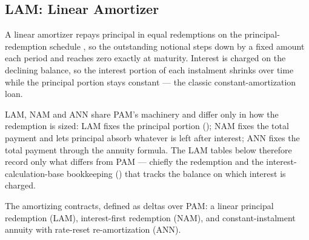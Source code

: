 \subsection{LAM: Linear Amortizer}\label{sec:lam}

A linear amortizer repays principal in equal redemptions on the
principal-redemption schedule , so the outstanding notional steps down
by a fixed amount each period and reaches zero exactly at maturity.  Interest is
charged on the declining balance, so the interest portion of each instalment
shrinks over time while the principal portion stays constant --- the classic
constant-amortization loan.

LAM, NAM and ANN share PAM's machinery and differ only in how the redemption is
sized: LAM fixes the principal portion (); NAM fixes the total
payment and lets principal absorb whatever is left after interest; ANN fixes the
total payment through the annuity formula.  The LAM tables below therefore
record only what differs from PAM --- chiefly the  redemption and the
interest-calculation-base bookkeeping () that tracks the balance on
which interest is charged.

\begin{definition}[AMORTIZERS]\label{def:amortizers}
        \leanok
        The amortizing contracts, defined as deltas over PAM: a linear principal redemption (LAM), interest-first redemption (NAM), and constant-instalment annuity with rate-reset re-amortization (ANN).
\end{definition}

